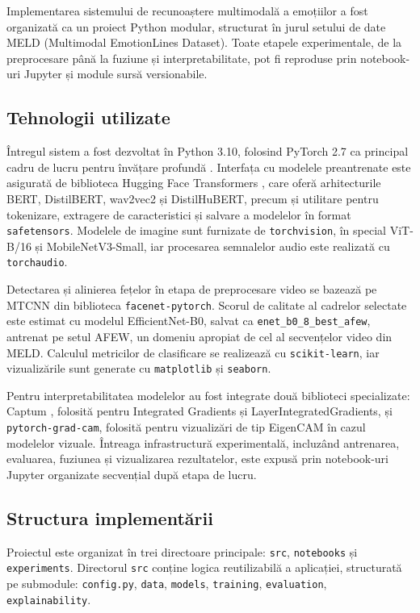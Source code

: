 \documentclass[12pt, a4paper]{article}
\begin{document}
Implementarea sistemului de recunoaștere multimodală a emoțiilor a fost organizată ca un proiect Python modular, structurat în jurul setului de date MELD (Multimodal EmotionLines Dataset). Toate etapele experimentale, de la preprocesare până la fuziune și interpretabilitate, pot fi reproduse prin notebook-uri Jupyter și module sursă versionabile.

\subsection{Tehnologii utilizate}

Întregul sistem a fost dezvoltat în Python 3.10, folosind PyTorch 2.7 ca principal cadru de lucru pentru învățare profundă \cite{paszke2019pytorch}. Interfața cu modelele preantrenate este asigurată de biblioteca Hugging Face Transformers \cite{wolf-etal-2020-transformers}, care oferă arhitecturile BERT, DistilBERT, wav2vec2 și DistilHuBERT, precum și utilitare pentru tokenizare, extragere de caracteristici și salvare a modelelor în format \texttt{safetensors}. Modelele de imagine sunt furnizate de \texttt{torchvision}, în special ViT-B/16 și MobileNetV3-Small, iar procesarea semnalelor audio este realizată cu \texttt{torchaudio}.

Detectarea și alinierea fețelor în etapa de preprocesare video se bazează pe MTCNN din biblioteca \texttt{facenet-pytorch}. Scorul de calitate al cadrelor selectate este estimat cu modelul EfficientNet-B0, salvat ca \texttt{enet\_b0\_8\_best\_afew}, antrenat pe setul AFEW, un domeniu apropiat de cel al secvențelor video din MELD. Calculul metricilor de clasificare se realizează cu \texttt{scikit-learn}, iar vizualizările sunt generate cu \texttt{matplotlib} și \texttt{seaborn}.

Pentru interpretabilitatea modelelor au fost integrate două biblioteci specializate: Captum \cite{kokhlikyan2020captum}, folosită pentru Integrated Gradients și LayerIntegratedGradients, și \texttt{pytorch-grad-cam}, folosită pentru vizualizări de tip EigenCAM în cazul modelelor vizuale. Întreaga infrastructură experimentală, incluzând antrenarea, evaluarea, fuziunea și vizualizarea rezultatelor, este expusă prin notebook-uri Jupyter organizate secvențial după etapa de lucru.

\subsection{Structura implementării}

Proiectul este organizat în trei directoare principale: \texttt{src\/}, \texttt{notebooks\/} și \texttt{experiments\/}. Directorul \texttt{src\/} conține logica reutilizabilă a aplicației, structurată pe submodule: \texttt{config.py}, \texttt{data}, \texttt{models}, \texttt{training}, \texttt{evaluation}, \texttt{explainability}.
\end{document}
